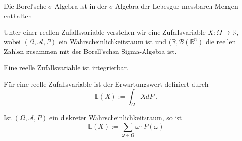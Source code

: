 \begin{Satz}
Die Borel'sche   $\sigma$-Algebra ist in der $\sigma$-Algebra der Lebesgue messbaren Mengen enthalten.
\end{Satz}

\begin{Definition}
Unter einer reellen Zufallsvariable verstehen wir eine Zufallsvariable $X : \Omega \to \mathbb{R}$, wobei $(\Omega, \mathcal{A}, P)$ ein Wahrscheinlichkeitsraum ist und $(\mathbb{R}, \mathcal{B}(\mathbb{R}^n)$ die reellen Zahlen zusammen mit der Borell'schen Sigma-Algebra ist.
\end{Definition}


\begin{Satz}
Eine reelle Zufallsvariable ist integrierbar.
\end{Satz}


\begin{Definition}
Für eine reelle Zufallsvariable ist der Erwartungswert definiert durch
$$ \mathbb{E} (X) := \int_{\Omega} X dP \; .$$
\end{Definition}

\begin{Satz}
Ist $(\Omega, \mathcal{A}, P)$ ein diskreter Wahrscheinlichkeitsraum, so ist
$$ \mathbb{E} (X) := \sum_{\omega \in \Omega}  \omega \cdot P(\omega)$$
\end{Satz}



